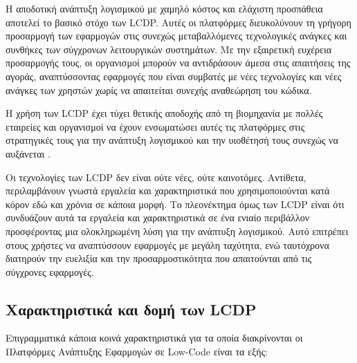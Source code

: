         Η αποδοτική ανάπτυξη λογισμικού με χαμηλό κόστος και ελάχιστη προσπάθεια αποτελεί το βασικό στόχο των LCDP. Αυτές οι πλατφόρμες διευκολύνουν τη γρήγορη προσαρμογή των εφαρμογών στις συνεχώς μεταβαλλόμενες τεχνολογικές ανάγκες και συνθήκες των σύγχρονων λειτουργικών συστημάτων. Με την εξαιρετική ευχέρεια προσαρμογής τους, οι οργανισμοί μπορούν να αντιδράσουν άμεσα στις απαιτήσεις της αγοράς, αναπτύσσοντας εφαρμογές που είναι συμβατές με νέες τεχνολογίες και νέες ανάγκες των χρηστών χωρίς να απαιτείται συνεχής αναθεώρηση του κώδικα.

        Η χρήση των LCDP έχει τύχει θετικής αποδοχής από τη βιομηχανία με πολλές εταιρείες και οργανισμοί να έχουν ενσωματώσει αυτές τις πλατφόρμες στις στρατηγικές τους για την ανάπτυξη λογισμικού και την υιοθέτησή τους συνεχώς να αυξάνεται \cite{Bock2021,Bucaioni2022,Sahay2020}.

        Οι τεχνολογίες των LCDP δεν είναι ούτε νέες, ούτε καινοτόμες. Αντίθετα, περιλαμβάνουν γνωστά εργαλεία και χαρακτηριστικά που χρησιμοποιούνται κατά κόρον εδώ και χρόνια σε κάποια μορφή. Το πλεονέκτημα όμως των LCDP είναι ότι συνδυάζουν αυτά τα εργαλεία και χαρακτηριστικά σε ένα ενιαίο περιβάλλον προσφέροντας μια ολοκληρωμένη λύση για την ανάπτυξη λογισμικού. Αυτό επιτρέπει στους χρήστες να αναπτύσσουν εφαρμογές με μεγάλη ταχύτητα, ενώ ταυτόχρονα διατηρούν την ευελιξία και την προσαρμοστικότητα που απαιτούνται από τις σύγχρονες εφαρμογές.

        \subsection{Χαρακτηριστικά και δομή των LCDP}
            Επιγραμματικά κάποια κοινά χαρακτηριστικά για τα οποία διακρίνονται οι Πλατφόρμες Ανάπτυξης Εφαρμογών σε Low-Code είναι τα εξής:

